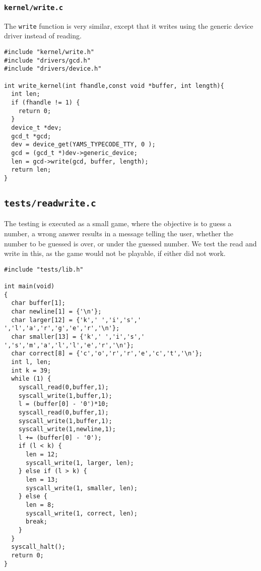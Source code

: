 \documentclass[a4paper,12pt]{article}
\begin{document}
\subsubsection{\texttt{kernel/write.c} }
The \texttt{write} function is very similar, except that it writes using the generic device driver instead of reading.

\begin{lstlisting}
#include "kernel/write.h"
#include "drivers/gcd.h"
#include "drivers/device.h"

int write_kernel(int fhandle,const void *buffer, int length){
  int len;
  if (fhandle != 1) {
    return 0;
  }
  device_t *dev;
  gcd_t *gcd;
  dev = device_get(YAMS_TYPECODE_TTY, 0 );
  gcd = (gcd_t *)dev->generic_device;
  len = gcd->write(gcd, buffer, length);
  return len;
}
\end{lstlisting}

\subsection{\texttt{tests/readwrite.c}}
The testing is executed as a small game, where the objective is to guess a number, a wrong answer results in a message telling the user, whether the number to be guessed is over, or under the guessed number. We test the read and write in this, as the game would not be playable, if either did not work.
\begin{lstlisting}
#include "tests/lib.h"

int main(void)
{
  char buffer[1];
  char newline[1] = {'\n'};
  char larger[12] = {'k',' ','i','s',' ','l','a','r','g','e','r','\n'};
  char smaller[13] = {'k',' ','i','s',' ','s','m','a','l','l','e','r','\n'};
  char correct[8] = {'c','o','r','r','e','c','t','\n'};
  int l, len;
  int k = 39;
  while (1) {
    syscall_read(0,buffer,1);
    syscall_write(1,buffer,1);
    l = (buffer[0] - '0')*10;
    syscall_read(0,buffer,1);
    syscall_write(1,buffer,1);
    syscall_write(1,newline,1);
    l += (buffer[0] - '0');
    if (l < k) {
      len = 12;
      syscall_write(1, larger, len);
    } else if (l > k) { 
      len = 13;
      syscall_write(1, smaller, len);
    } else {
      len = 8;
      syscall_write(1, correct, len);
      break;
    }
  }
  syscall_halt();
  return 0;
}
\end{lstlisting}
\end{document}
